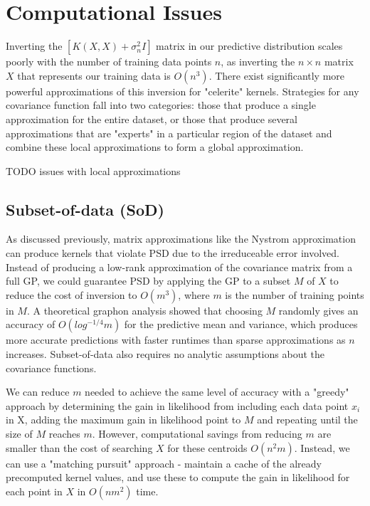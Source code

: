 \section{Computational Issues}

Inverting the $[K(X,X) + \sigma^2_nI]$ matrix in our predictive distribution scales poorly with the number of training data points $n$, as inverting the $n \times n$ matrix $X$ that represents our training data is $O(n^3)$. There exist significantly more powerful approximations of this inversion for "celerite" kernels. Strategies for any covariance function fall into two categories: those that produce a single approximation for the entire dataset, or those that produce several approximations that are "experts" in a particular region of the dataset and combine these local approximations to form a global approximation.

TODO issues with local approximations


\subsection{Subset-of-data (SoD) \cite{big-data}}
As discussed previously, matrix approximations like the Nystrom approximation can produce kernels that violate PSD due to the irreduceable error involved. Instead of producing a low-rank approximation of the covariance matrix from a full GP, we could guarantee PSD by applying the GP to a subset $M$ of $X$ to reduce the cost of inversion to $O(m^3)$, where $m$ is the number of training points in $M$. A theoretical graphon analysis showed that choosing $M$ randomly gives an accuracy of $O(log^{-1/4}m)$ for the predictive mean and variance, which produces more accurate predictions with faster runtimes than sparse approximations as $n$ increases. \cite{random-subsampling} Subset-of-data also requires no analytic assumptions about the covariance functions.


We can reduce $m$ needed to achieve the same level of accuracy with a "greedy" approach by determining the gain in likelihood from including each data point $x_i$ in X, adding the maximum gain in likelihood point to $M$ and repeating until the size of $M$ reaches $m$. However, computational savings from reducing $m$ are smaller than the cost of searching $X$ for these centroids $O(n^2m)$. Instead, we can use a "matching pursuit" approach - maintain a cache of the already precomputed kernel values, and use these to compute the gain in likelihood for each point in $X$ in $O(nm^2)$ time. \cite{matching-pursuit}

